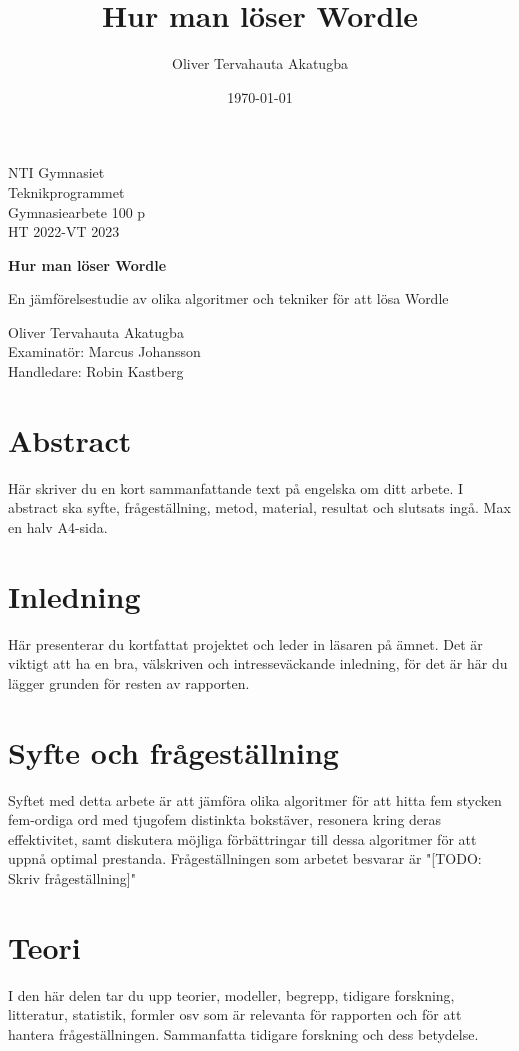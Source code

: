 \documentclass{article}
\title{Hur man löser Wordle}
\author{Oliver Tervahauta Akatugba}
\date{\today}
\begin{document}
\begin{titlepage}
\noindent
NTI Gymnasiet \\
Teknikprogrammet \\
Gymnasiearbete 100 p \\
HT 2022-VT 2023
\begin{center}
\vspace*{1.5cm}
\Huge
\textbf{Hur man löser Wordle}
\vspace{0.5cm}

\large
En jämförelsestudie av olika algoritmer och tekniker för att lösa Wordle
\end{center}

\vfill
\normalsize
\noindent
Oliver Tervahauta Akatugba\\
Examinatör: Marcus Johansson\\
Handledare: Robin Kastberg
\end{titlepage}

\section*{Abstract}
Här skriver du en kort sammanfattande text på engelska om ditt arbete. I abstract ska syfte, frågeställning, metod, material, resultat och slutsats ingå. Max en halv A4-sida. 
\clearpage

\tableofcontents
\clearpage

\section{Inledning}
Här presenterar du kortfattat projektet och leder in läsaren på ämnet. Det är viktigt att ha en bra, välskriven och intresseväckande inledning, för det är här du lägger grunden för resten av rapporten.

\section{Syfte och frågeställning}
Syftet med detta arbete är att jämföra olika algoritmer för att hitta fem stycken fem-ordiga ord med tjugofem distinkta bokstäver, resonera kring deras effektivitet, samt diskutera möjliga förbättringar till dessa algoritmer för att uppnå optimal prestanda. Frågeställningen som arbetet besvarar är "[TODO: Skriv frågeställning]"

\section{Teori}
I den här delen tar du upp teorier, modeller, begrepp, tidigare forskning, litteratur, statistik, formler osv som är relevanta för rapporten och för att hantera frågeställningen. Sammanfatta tidigare forskning och dess betydelse. 
\end{document}

